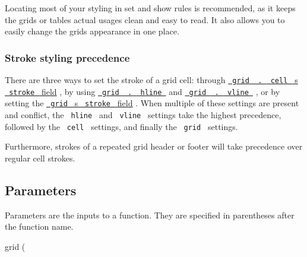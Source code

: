 Locating most of your styling in set and show rules is recommended, as
it keeps the grid\textquotesingle s or table\textquotesingle s actual
usages clean and easy to read. It also allows you to easily change the
grid\textquotesingle s appearance in one place.

\subsubsection{Stroke styling
precedence}\label{stroke-styling-precedence}

There are three ways to set the stroke of a grid cell: through
\href{/docs/reference/layout/grid/\#definitions-cell-stroke}{\texttt{\ grid\ }{\texttt{\ .\ }}\texttt{\ cell\ }
\textquotesingle s \texttt{\ stroke\ } field} , by using
\href{/docs/reference/layout/grid/\#definitions-hline}{\texttt{\ grid\ }{\texttt{\ .\ }}\texttt{\ hline\ }}
and
\href{/docs/reference/layout/grid/\#definitions-vline}{\texttt{\ grid\ }{\texttt{\ .\ }}\texttt{\ vline\ }}
, or by setting the
\href{/docs/reference/layout/grid/\#parameters-stroke}{\texttt{\ grid\ }
\textquotesingle s \texttt{\ stroke\ } field} . When multiple of these
settings are present and conflict, the \texttt{\ hline\ } and
\texttt{\ vline\ } settings take the highest precedence, followed by the
\texttt{\ cell\ } settings, and finally the \texttt{\ grid\ } settings.

Furthermore, strokes of a repeated grid header or footer will take
precedence over regular cell strokes.

\subsection{\texorpdfstring{{ Parameters
}}{ Parameters }}\label{parameters}

\label{parameters-tooltip}
Parameters are the inputs to a function. They are specified in
parentheses after the function name.

{ grid } (

